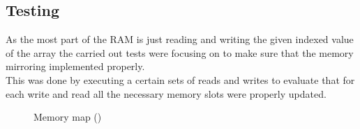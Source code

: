 \documentclass[]{report}
\begin{document}
\subsection{Testing}
As the most part of the RAM is just reading and writing the given indexed value of the array the carried out tests were focusing on to make sure that the memory mirroring implemented properly.
\\
This was done by executing a certain sets of reads and writes to evaluate that for each write and read all the necessary memory slots were properly updated.


\begin{figure}[!htb]
	\caption{\label{fig:my-label} Memory map (\cite{NSPF})}
\end{figure}
\clearpage
\end{document}
